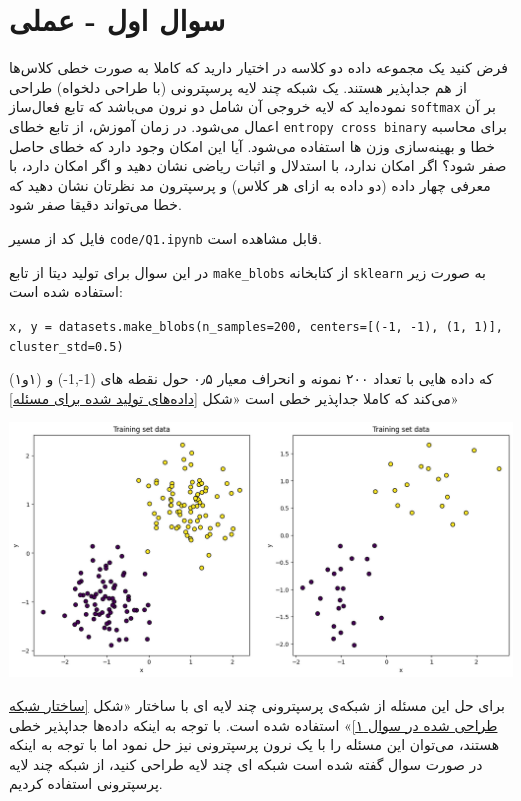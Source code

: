 \section{سوال اول - عملی}

فرض کنید یک مجموعه داده دو کلاسه در اختیار دارید که کاملا به صورت خطی کلاس‌ها از هم جداپذیر هستند. یک شبکه چند لایه پرسپترونی (با طراحی دلخواه) طراحی نموده‌اید که لایه خروجی آن شامل دو نرون می‌باشد که تابع فعال‌ساز \texttt{softmax} بر آن اعمال می‌شود. در زمان آموزش، از تابع خطای \texttt{entropy cross binary} برای محاسبه خطا و بهینه‌سازی وزن ها استفاده می‌شود. آیا این امکان وجود دارد که خطای حاصل صفر شود؟ اگر امکان ندارد، با استدلال و اثبات ریاضی نشان دهید و اگر امکان دارد، با معرفی چهار داده (دو داده به ازای هر کلاس) و پرسپترون مد نظرتان نشان دهید که خطا می‌تواند دقیقا صفر شود.


\begin{qsolve}
	فایل کد از مسیر \texttt{code/Q1.ipynb} قابل مشاهده است.
	
	
	در این سوال برای تولید دیتا از تابع \texttt{make\_blobs} از کتابخانه \texttt{sklearn} به صورت زیر استفاده شده است:‌
	
	\begin{latin}
		\texttt{x, y = datasets.make\_blobs(n\_samples=200, centers=[(-1, -1), (1, 1)], cluster\_std=0.5)}
	\end{latin}
	
	که داده هایی با تعداد ۲۰۰ نمونه و انحراف معیار ۰٫۵ حول نقطه های (1-,1-) و (۱و۱) می‌کند که کاملا جداپذیر خطی است «شکل \ref{داده‌های تولید شده برای مسئله}»
	
	\begin{center}
		\includegraphics*[width=1\linewidth]{pics/img1.png}
		\label{داده‌های تولید شده برای مسئله}
	\end{center}
	
	
	برای حل این مسئله از شبکه‌ی پرسپترونی چند لایه ای با ساختار «شکل \ref{ساختار شبکه طراحی شده در سوال ۱}» استفاده شده است. با توجه به اینکه داده‌ها جداپذیر خطی هستند، می‌توان این مسئله را با یک نرون پرسپترونی نیز حل نمود اما با توجه به اینکه در صورت سوال گفته شده است شبکه ای چند لایه طراحی کنید، از شبکه چند لایه پرسپترونی استفاده کردیم.
\end{qsolve}




